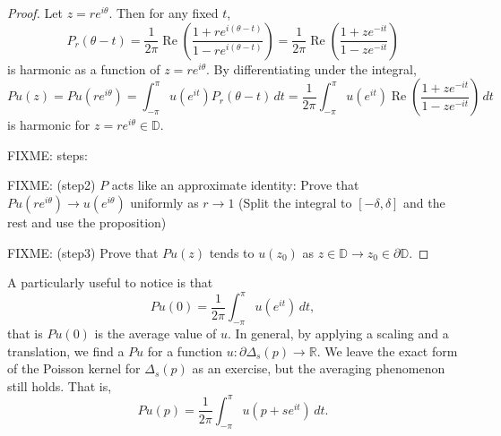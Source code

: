 \documentclass[12pt,openany]{book}
\renewcommand{\Re}{\operatorname{Re}}
\newcommand{\R}{{\mathbb{R}}}
\newcommand{\D}{{\mathbb{D}}}
\theoremstyle{plain}
\theoremstyle{remark}
\theoremstyle{definition}
\theoremstyle{exercise}
\theoremstyle{example}
\begin{document}
\begin{proof}
Let $z = re^{i\theta}$.
Then for any fixed $t$,
\begin{equation*}
P_r(\theta-t)
=
\frac{1}{2\pi}
\Re
\left(
\frac{1+re^{i(\theta-t)}}{1-re^{i(\theta-t)}}
\right) 
=
\frac{1}{2\pi}
\Re
\left(
\frac{1+ze^{-it}}{1-ze^{-it}}
\right)
\end{equation*}
is harmonic as a function of $z=re^{i\theta}$.
By differentiating under the integral,
\begin{equation*}
Pu(z)
=
Pu(re^{i\theta})
=
\int_{-\pi}^\pi u(e^{it}) P_r(\theta-t) \, dt
=
\frac{1}{2\pi}
\int_{-\pi}^\pi u(e^{it}) 
\Re
\left(
\frac{1+z e^{-it}}{1-z e^{-it}}
\right) 
\, dt
\end{equation*}
is harmonic for $z = re^{i\theta} \in \D$.

FIXME: steps:

FIXME: (step2)
$P$ acts like an
approximate identity: Prove that
$Pu(re^{i\theta}) \to u(e^{i\theta})$ uniformly as
$r \to 1$ (Split the integral to $[-\delta,\delta]$ and the rest
and use the proposition)

FIXME: (step3)
Prove that $Pu(z)$ tends to $u(z_0)$ as
$z \in \D \to z_0 \in \partial \D$.
\end{proof}

A particularly useful to notice is that
\begin{equation*}
Pu(0) = \frac{1}{2\pi} \int_{-\pi}^{\pi}u(e^{it}) \, dt ,
\end{equation*}
that is $Pu(0)$ is the average value of $u$.  In general, by applying
a scaling and a translation, we find a $Pu$ for a function $u \colon
\partial \Delta_s(p) \to \R$.  We
leave the exact form of the Poisson kernel for $\Delta_s(p)$ as an
exercise, but the averaging phenomenon still holds.  That is,
\begin{equation} \label{eq:averageofPu}
Pu(p) = \frac{1}{2\pi} \int_{-\pi}^{\pi}u(p + s e^{it}) \, dt .
\end{equation}
\end{document}
